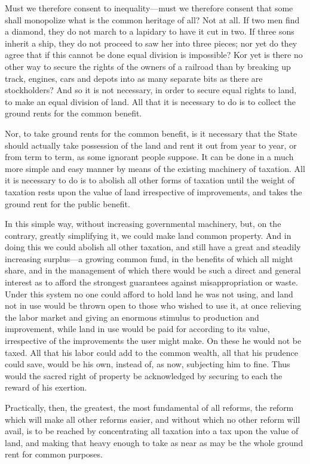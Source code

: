 \documentclass{book}
\begin{document}
Must we therefore consent to inequality—must we therefore consent that some shall monopolize what is the common heritage of all? Not at all. If two men find a diamond, they do not march to a lapidary to have it cut in two. If three sons inherit a ship, they do not proceed to saw her into three pieces; nor yet do they agree that if this cannot be done equal division is impossible? Kor yet is there no other way to secure the rights of the owners of a railroad than by breaking up track, engines, cars and depots into as many separate bits as there are stockholders? And so it is not necessary, in order to secure equal rights to land, to make an equal division of land. All that it is necessary to do is to collect the ground rents for the common benefit.

Nor, to take ground rents for the common benefit, is it necessary that the State should actually take possession of the land and rent it out from year to year, or from term to term, as some ignorant people suppose. It can be done in a much more simple and easy manner by means of the existing machinery of taxation. All it is necessary to do is to abolish all other forms of taxation until the weight of taxation rests upon the value of land irrespective of improvements, and takes the ground rent for the public benefit.

In this simple way, without increasing governmental machinery, but, on the contrary, greatly simplifying it, we could make land common property. And in doing this we could abolish all other taxation, and still have a great and steadily increasing surplus—a growing common fund, in the benefits of which all might share, and in the management of which there would be such a direct and general interest as to afford the strongest guarantees against misappropriation or waste. Under this system no one could afford to hold land he was not using, and land not in use would be thrown open to those who wished to use it, at once relieving the labor market and giving an enormous stimulus to production and improvement, while land in use would be paid for according to its value, irrespective of the improvements the user might make. On these he would not be taxed. All that his labor could add to the common wealth, all that his prudence could save, would be his own, instead of, as now, subjecting him to fine. Thus would the sacred right of property be acknowledged by securing to each the reward of his exertion.

Practically, then, the greatest, the most fundamental of all reforms, the reform which will make all other reforms easier, and without which no other reform will avail, is to be reached by concentrating all taxation into a tax upon the value of land, and making that heavy enough to take as near as may be the whole ground rent for common purposes.
\end{document}

